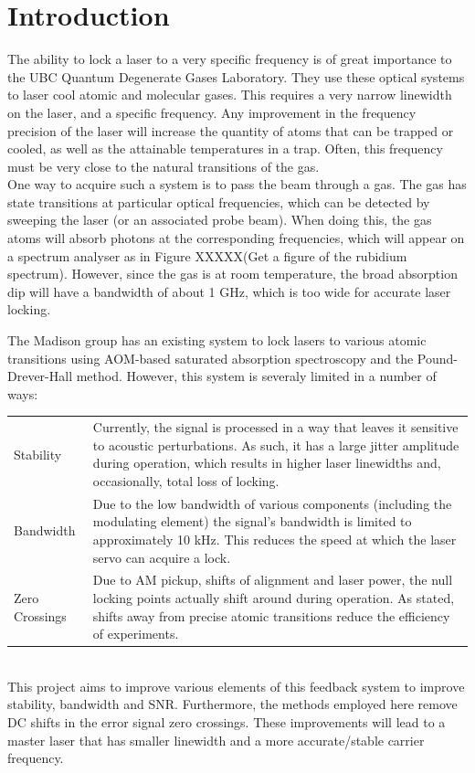 \newpage
\section{Introduction}

The ability to lock a laser to a very specific frequency is of great importance to the UBC Quantum Degenerate Gases Laboratory.  They use these optical systems to laser cool atomic and molecular gases.  This requires a very narrow linewidth on the laser, and a specific frequency.  Any improvement in the frequency precision of the laser will increase the quantity of atoms that can be trapped or cooled, as well as the attainable temperatures in a trap.  Often, this frequency must be very close to the natural transitions of the gas. \\

One way to acquire such a system is to pass the beam through a gas.  The gas has state transitions at particular optical frequencies, which can be detected by sweeping the laser (or an associated probe beam).  When doing this, the gas atoms will absorb photons at the corresponding frequencies, which will appear on a spectrum analyser as in Figure XXXXX(Get a figure of the rubidium spectrum).  However, since the gas is at room temperature, the broad absorption dip will have a bandwidth of about 1 GHz, which is too wide for accurate laser locking.

The Madison group has an existing system to lock lasers to various atomic transitions using AOM-based saturated absorption spectroscopy and the Pound-Drever-Hall method. However, this system is severaly limited in a number of ways: \\
\begin{tabularx}{\linewidth}{lX}
  Stability & Currently, the signal is processed in a way that leaves it sensitive to acoustic perturbations. As such, it has a large jitter amplitude during operation, which results in higher laser linewidths and, occasionally, total loss of locking. \\
  Bandwidth & Due to the low bandwidth of various components (including the modulating element) the signal's bandwidth is limited to approximately 10 kHz. This reduces the speed at which the laser servo can acquire a lock. \\
  Zero Crossings & Due to AM pickup, shifts of alignment and laser power, the null locking points actually shift around during operation. As stated, shifts away from precise atomic transitions reduce the efficiency of experiments.
\end{tabularx} \\
This project aims to improve various elements of this feedback system to improve stability, bandwidth and SNR. Furthermore, the methods employed here remove DC shifts in the error signal zero crossings. These improvements will lead to a master laser that has smaller linewidth and a more accurate/stable carrier frequency.

